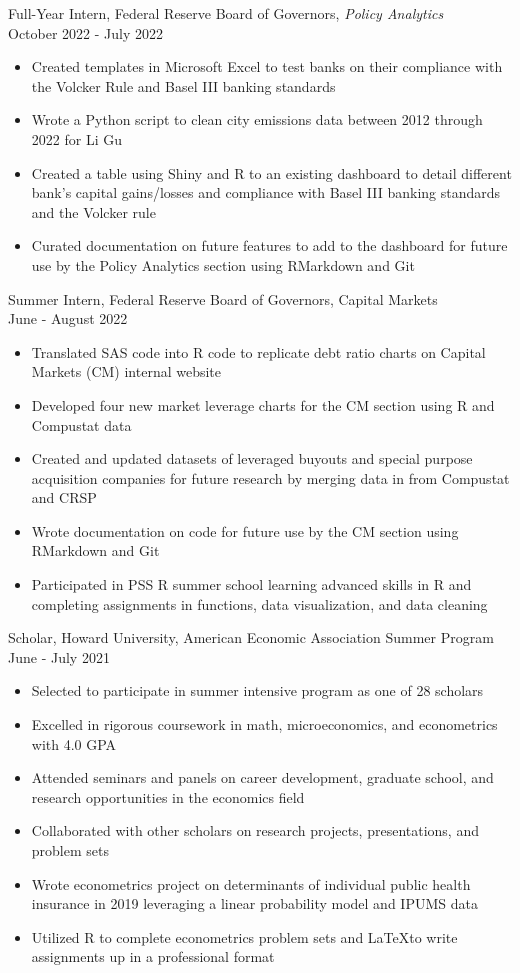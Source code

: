 \documentclass[margin, 11pt]{res} %
\begin{document}
\begin{resume}
Full-Year Intern, Federal Reserve Board of Governors, \emph{Policy Analytics}
\\ 
October 2022 - July 2022 
	\begin{itemize}
		\item Created templates in Microsoft Excel to test banks on their compliance with the Volcker Rule and Basel III banking standards
		\item Wrote a Python script to clean city emissions data between 2012 through 2022 for Li Gu
		\item Created a table using Shiny and R to an existing dashboard to detail different bank's capital gains/losses and compliance with Basel III banking standards and the Volcker rule
		\item Curated documentation on future features to add to the dashboard for future use by the Policy Analytics section using RMarkdown and Git
	\end{itemize}
Summer Intern, Federal Reserve Board of Governors, Capital Markets \\ June - August 2022 
	\begin{itemize}
		\item Translated SAS code into R code to replicate debt ratio charts on Capital Markets (CM) internal website 
		\item Developed four new market leverage charts for the CM section using R and Compustat data
		\item Created and updated datasets of leveraged buyouts and special purpose acquisition companies for future research by merging data in from Compustat and CRSP 
		\item Wrote documentation on code for future use by the CM section using RMarkdown and Git
		\item Participated in PSS R summer school learning advanced skills in R and completing assignments in functions, data visualization, and data cleaning 
	\end{itemize}

Scholar, Howard University, American Economic Association Summer Program \\
June - July 2021
	\begin{itemize}
		\item Selected to participate in summer intensive program as one of 28 scholars
		\item Excelled in rigorous coursework in math, microeconomics, and econometrics with 4.0 GPA
		\item Attended seminars and panels on career development, graduate school, and research opportunities in the economics field
		\item Collaborated with other scholars on research projects, presentations, and problem sets
		\item Wrote econometrics project on determinants of individual public health insurance in 2019 leveraging a linear probability model and IPUMS data
		\item Utilized R to complete econometrics problem sets and \LaTeX to write assignments up in a professional format
	\end{itemize}


\end{resume}
\end{document}
